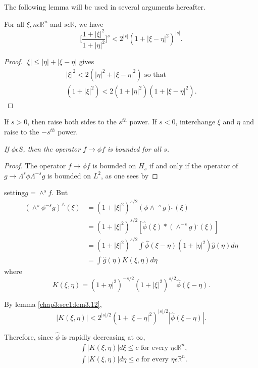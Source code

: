 The following lemma will be used in several arguments hereafter.

\setcounter{lem}{11}
\begin{lem}\label{chap3:sec1:lem3.12} %
For all $\xi, n \epsilon \mathbb{R}^n$ and $s \epsilon
  \mathbb{R}$, we have 
$$
\Bigg[\frac{1 + | \xi |^2}{1 + | \eta |^2} \Bigg]^s < 2^{| s |} (1 + |
\xi - \eta |^2)^{| s |}. 
$$
\end{lem}

\begin{proof}
  $| \xi | \leq | \eta | + | \xi - \eta |$ gives
  \begin{gather*}
    | \xi |^2 < 2 (| \eta |^2 + | \xi - \eta |^2) \text{ so that }\\
    (1 + | \xi |^2) < 2 (1 + |\eta|^2) (1 + | \xi - \eta |^2).
  \end{gather*}
\end{proof}

If $s > 0$, then raise both sides to the $s^{th}$ power. If $s < 0$,
interchange $\xi$ and $\eta$ and raise to the $-s^{th}$ power. 

\setcounter{prop}{12}
\begin{prop}\label{chap3:sec1:prop3.13}%
  {\em If $\phi \epsilon S$, then the operator $f \to \phi f$ is
    bounded for all $s$.} 
\end{prop}
\begin{proof}
  The operator $f \to \phi f$ is bounded on $H_s$ if and only if the
  operator of $g \to \Lambda^s \phi \Lambda^{-s} g$ is bounded on $L^2$,
  as one sees by   
\end{proof}
setting\pageoriginale $g = \wedge^s f$. But
\begin{align*}
  (\wedge ^s \phi^{-s} g)^{\wedge}(\xi ) & = (1+ |\xi |^2 )^{s/2} (\phi
  \wedge ^{-s} g)\hat{~}(\xi )\\ 
 & = (1+ |\xi |^2 )^{s/2} \left[\hat{\phi} (\xi) *  (\wedge ^{-s}g)
    {}^{\hat{}}(\xi) \right ]\\ 
 & = (1+ |\xi |^2 )^{s/2} \int \hat{\phi}(\xi - \eta) ( 1+ |\eta
  |^2)\hat{g}(\eta) d	\eta \\ 
 & = \int \hat{g} (\eta) K (\xi, \eta) d \eta
\end{align*}
where 
$$
K (\xi, \eta) = (1+ \eta |^2)^{-{s/2}} ( 1+ |\xi|^2)^{s/2} \hat{\phi}
(\xi -\eta). 
$$ 

By lemma \ref{chap3:sec1:lem3.12},
$$
|K(\xi, \eta)| < 2^{|s|/2} (1 + |\xi - \eta|^2)^{|s| /2}
|\hat{\phi}(\xi - \eta)|. 
$$

Therefore, since $\hat{\phi}$ is rapidly decreasing at $\infty$, 
\begin{align*}
  &\int |K (\xi, \eta)| d \xi  \le c \text{ for every } \eta \epsilon
  \mathbb{R}^n,\\ 
  &\int |K (\xi, \eta)| d \eta  \le c \text{ for every }
  \eta \epsilon \mathbb{R}^n. 
\end{align*}

